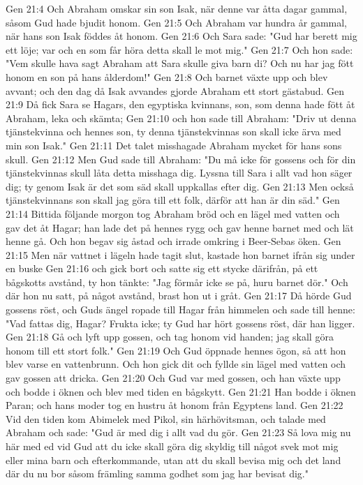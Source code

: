 Gen 21:4  Och Abraham omskar sin son Isak, när denne var åtta dagar gammal, såsom Gud hade bjudit honom.
Gen 21:5  Och Abraham var hundra år gammal, när hans son Isak föddes åt honom.
Gen 21:6  Och Sara sade: "Gud har berett mig ett löje; var och en som får höra detta skall le mot mig."
Gen 21:7  Och hon sade: "Vem skulle hava sagt Abraham att Sara skulle giva barn di? Och nu har jag fött honom en son på hans ålderdom!"
Gen 21:8  Och barnet växte upp och blev avvant; och den dag då Isak avvandes gjorde Abraham ett stort gästabud.
Gen 21:9  Då fick Sara se Hagars, den egyptiska kvinnans, son, som denna hade fött åt Abraham, leka och skämta;
Gen 21:10  och hon sade till Abraham: "Driv ut denna tjänstekvinna och hennes son, ty denna tjänstekvinnas son skall icke ärva med min son Isak."
Gen 21:11  Det talet misshagade Abraham mycket för hans sons skull.
Gen 21:12  Men Gud sade till Abraham: "Du må icke för gossens och för din tjänstekvinnas skull låta detta misshaga dig. Lyssna till Sara i allt vad hon säger dig; ty genom Isak är det som säd skall uppkallas efter dig.
Gen 21:13  Men också tjänstekvinnans son skall jag göra till ett folk, därför att han är din säd."
Gen 21:14  Bittida följande morgon tog Abraham bröd och en lägel med vatten och gav det åt Hagar; han lade det på hennes rygg och gav henne barnet med och lät henne gå. Och hon begav sig åstad och irrade omkring i Beer-Sebas öken.
Gen 21:15  Men när vattnet i lägeln hade tagit slut, kastade hon barnet ifrån sig under en buske
Gen 21:16  och gick bort och satte sig ett stycke därifrån, på ett bågskotts avstånd, ty hon tänkte: "Jag förmår icke se på, huru barnet dör." Och där hon nu satt, på något avstånd, brast hon ut i gråt.
Gen 21:17  Då hörde Gud gossens röst, och Guds ängel ropade till Hagar från himmelen och sade till henne: "Vad fattas dig, Hagar? Frukta icke; ty Gud har hört gossens röst, där han ligger.
Gen 21:18  Gå och lyft upp gossen, och tag honom vid handen; jag skall göra honom till ett stort folk."
Gen 21:19  Och Gud öppnade hennes ögon, så att hon blev varse en vattenbrunn. Och hon gick dit och fyllde sin lägel med vatten och gav gossen att dricka.
Gen 21:20  Och Gud var med gossen, och han växte upp och bodde i öknen och blev med tiden en bågskytt.
Gen 21:21  Han bodde i öknen Paran; och hans moder tog en hustru åt honom från Egyptens land.
Gen 21:22  Vid den tiden kom Abimelek med Pikol, sin härhövitsman, och talade med Abraham och sade: "Gud är med dig i allt vad du gör.
Gen 21:23  Så lova mig nu här med ed vid Gud att du icke skall göra dig skyldig till något svek mot mig eller mina barn och efterkommande, utan att du skall bevisa mig och det land där du nu bor såsom främling samma godhet som jag har bevisat dig."
